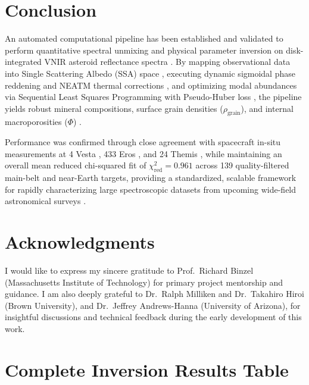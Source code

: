 \documentclass[11pt,a4paper]{article}
\begin{document}
\section{Conclusion}
\label{sec:conclusion}

An automated computational pipeline has been established and validated to perform quantitative spectral unmixing and physical parameter inversion on disk-integrated VNIR asteroid reflectance spectra \cite{Tarantola2005, Consolmagno2008, Carry2012}. By mapping observational data into Single Scattering Albedo (SSA) space \cite{Hapke1981, Hapke2012}, executing dynamic sigmoidal phase reddening and NEATM thermal corrections \cite{Harris1998, Sanchez2012, Fornasier2015}, and optimizing modal abundances via Sequential Least Squares Programming with Pseudo-Huber loss \cite{Lawson1995, Huber1964, Bioucas2012}, the pipeline yields robust mineral compositions, surface grain densities ($\rho_{\text{grain}}$), and internal macroporosities ($\Phi$) \cite{Consolmagno2008, Carry2012}.

Performance was confirmed through close agreement with spacecraft in-situ measurements at 4 Vesta \cite{Russell2012, Prettyman2012}, 433 Eros \cite{Veverka2001, Britt2002, Yeomans2000}, and 24 Themis \cite{Campins2010}, while maintaining an overall mean reduced chi-squared fit of $\chi^2_{\text{red}} = 0.961$ across 139 quality-filtered main-belt and near-Earth targets, providing a standardized, scalable framework for rapidly characterizing large spectroscopic datasets from upcoming wide-field astronomical surveys \cite{DeMeo2009, Britt2002, Lauretta2019, Watanabe2019}.

\section*{Acknowledgments}
I would like to express my sincere gratitude to Prof.~Richard Binzel (Massachusetts Institute of Technology) for primary project mentorship and guidance. I am also deeply grateful to Dr.~Ralph Milliken and Dr.~Takahiro Hiroi (Brown University), and Dr.~Jeffrey Andrews-Hanna (University of Arizona), for insightful discussions and technical feedback during the early development of this work.

\appendix
\section{Complete Inversion Results Table}
\label{sec:appendix_results}

\end{document}
